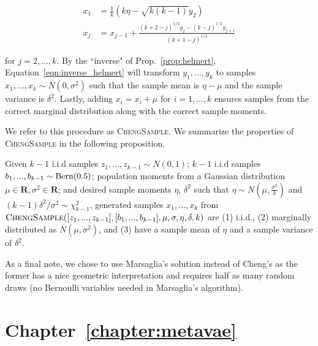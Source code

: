 \begin{align}
    x_1 &= \frac{1}{k}(k\eta - \sqrt{k(k-1)}y_2) \\
    x_j &= x_{j-1} + \frac{(k+2-j)^{1/2}y_j - (k-j)^{1/2}y_{j+1}}{(k + 1 - j)^{1/2}}
\label{eqn:inverse_helmert}
\end{align}

for $j = 2, ..., k$. By the ``inverse" of Prop.~\ref{prop:helmert}, Equation~\ref{eqn:inverse_helmert} will transform $y_1, ..., y_k$ to samples $x_1, ..., x_k \sim N(0, \sigma^2)$ such that the sample mean is $\eta - \mu$ and the sample variance is $\delta^2$. Lastly, adding $x_i = x_i + \mu$ for $i=1, ..., k$ ensures samples from the correct marginal distribution along with the correct sample moments.


We refer to this procedure as \textsc{ChengSample}. We summarize the properties of \textsc{ChengSample} in the following proposition.

\begin{prop}
Given $k - 1$ i.i.d samples $z_1, ..., z_{k-1} \sim N(0, 1)$; $k-1$ i.i.d samples $b_1, ..., b_{k-1} \sim \textup{Bern}(0.5)$; population moments from a Gaussian distribution $\mu \in \mathbf{R}, \sigma^2 \in \mathbf{R}$; and desired sample moments $\eta$, $\delta^2$ such that $\eta \sim N(\mu, \frac{\sigma^2}{k})$ and $(k-1)\delta^2/\sigma^2 \sim \chi^2_{k-1}$,
generated samples $x_1, ..., x_k$ from $\textsc{ChengSample}([z_1, ..., z_{k-1}], [b_1, ..., b_{k-1}], \mu, \sigma, \eta, \delta, k)$ are (1) i.i.d., (2) marginally distributed as $N(\mu, \sigma^2)$, and (3) have a sample mean of $\eta$ and a sample variance of $\delta^2$.
\label{lemma:important}
\end{prop}

As a final note, we chose to use Marsaglia's solution instead of Cheng's as the former has a nice geometric interpretation and requires half as many random draws (no Bernoulli variables needed in Marsaglia's algorithm).


\section{Chapter~\ref{chapter:metavae}}

